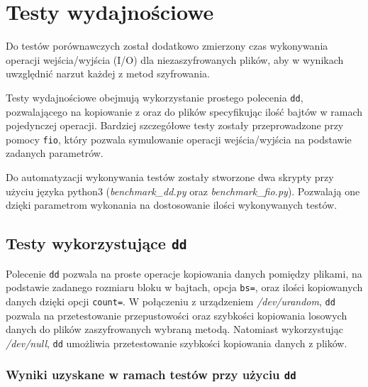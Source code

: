 \documentclass[a4paper]{article}
\begin{document}
\section{Testy wydajnościowe}
Do testów porównawczych został dodatkowo zmierzony czas wykonywania operacji wejścia/wyjścia
(I/O) dla niezaszyfrowanych plików, aby w wynikach uwzględnić narzut każdej z metod szyfrowania.

Testy wydajnościowe obejmują wykorzystanie prostego polecenia \texttt{dd}, pozwalającego na
kopiowanie z oraz do plików specyfikując ilość bajtów w ramach pojedynczej operacji.
Bardziej szczegółowe testy zostały przeprowadzone przy pomocy \texttt{fio}, który pozwala
symulowanie operacji wejścia/wyjścia na podstawie zadanych parametrów.

Do automatyzacji wykonywania testów zostały stworzone dwa skrypty przy użyciu języka python3
(\textit{benchmark\_dd.py} oraz \textit{benchmark\_fio.py}). Pozwalają one dzięki
parametrom wykonania na dostosowanie ilości wykonywanych testów.

\subsection{Testy wykorzystujące \texttt{dd}}
Polecenie \texttt{dd} pozwala na proste operacje kopiowania danych pomiędzy plikami,
na podstawie zadanego rozmiaru bloku w bajtach, opcja \texttt{bs=}, oraz ilości kopiowanych
danych dzięki opcji \texttt{count=}. W połączeniu z urządzeniem \textit{/dev/urandom},
\texttt{dd} pozwala na przetestowanie przepustowości oraz szybkości kopiowania losowych danych
do plików zaszyfrowanych wybraną metodą. Natomiast wykorzystując \textit{/dev/null},
\texttt{dd} umożliwia przetestowanie szybkości kopiowania danych z plików.


\subsubsection{Wyniki uzyskane w ramach testów przy użyciu \texttt{dd}}
\end{document}
